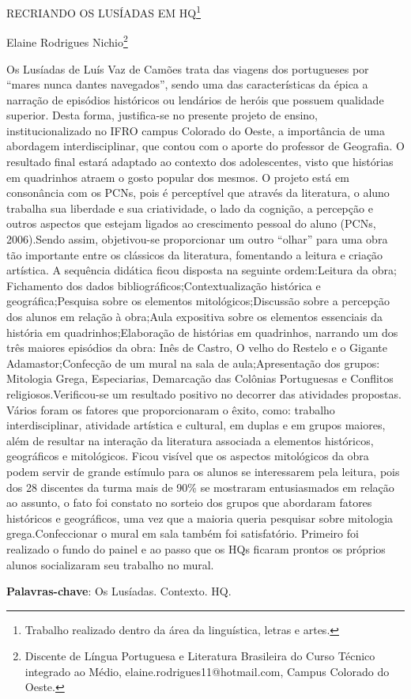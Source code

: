 \documentclass[article,12pt,onesidea,4paper,english,brazil]{abntex2}
\begin{document}
	
	
	\frenchspacing 
	
	\begin{center}
		\LARGE RECRIANDO OS LUSÍADAS EM HQ\footnote{Trabalho realizado dentro da área da linguística, letras e artes.}
		
		\normalsize
		Elaine Rodrigues Nichio\footnote{Discente de Língua Portuguesa e Literatura Brasileira do Curso Técnico integrado ao Médio, elaine.rodrigues11@hotmail.com, Campus Colorado do Oeste.}
	\end{center}
	
	\noindent 
	Os Lusíadas de Luís Vaz de Camões trata das viagens dos portugueses por “mares nunca dantes navegados”, sendo uma das características da épica a narração de episódios históricos ou lendários de heróis que possuem qualidade superior. Desta forma, justifica-se no presente projeto de ensino, institucionalizado no IFRO campus Colorado do Oeste, a importância de uma abordagem interdisciplinar, que contou com o aporte do professor de Geografia. O resultado final estará adaptado ao contexto dos adolescentes, visto que histórias em quadrinhos atraem o gosto popular dos mesmos. O projeto está em consonância com os PCNs, pois é perceptível que através da literatura, o aluno trabalha sua liberdade e sua criatividade, o lado da cognição, a percepção e outros aspectos que estejam ligados ao crescimento pessoal do aluno (PCNs, 2006).Sendo assim, objetivou-se proporcionar um outro “olhar” para uma obra tão importante entre os clássicos da literatura, fomentando a leitura e criação artística. A sequência didática ficou disposta na seguinte ordem:Leitura da obra; Fichamento dos dados bibliográficos;Contextualização histórica e geográfica;Pesquisa sobre os elementos mitológicos;Discussão sobre a percepção dos alunos em relação à obra;Aula expositiva sobre os elementos essenciais da história em quadrinhos;Elaboração de histórias em quadrinhos, narrando um dos três maiores episódios da obra: Inês de Castro, O velho do Restelo e o Gigante Adamastor;Confecção de um mural na sala de aula;Apresentação dos grupos: Mitologia Grega, Especiarias, Demarcação das Colônias Portuguesas e Conflitos religiosos.Verificou-se um resultado positivo no decorrer das atividades propostas. Vários foram os fatores que proporcionaram o êxito, como: trabalho interdisciplinar, atividade artística e cultural, em duplas e em grupos maiores, além de resultar na interação da literatura associada a elementos históricos, geográficos e mitológicos. Ficou visível que os aspectos mitológicos da obra podem servir de grande estímulo para os alunos se interessarem pela leitura, pois dos 28 discentes da turma mais de 90\% se mostraram entusiasmados em relação ao assunto, o fato foi constato no sorteio dos grupos que abordaram fatores históricos e geográficos, uma vez que a maioria queria pesquisar sobre mitologia grega.Confeccionar o mural em sala também foi satisfatório. Primeiro foi realizado o fundo do painel e ao passo que os HQs ficaram prontos os próprios alunos socializaram seu trabalho no mural.
	
	\vspace{\onelineskip}
	
	\noindent
	\textbf{Palavras-chave}: Os Lusíadas. Contexto. HQ.
	
\end{document}
